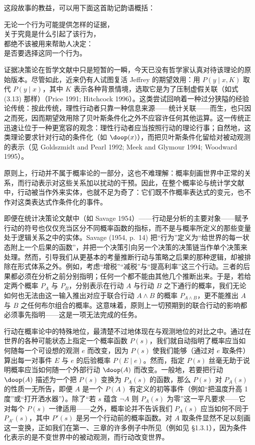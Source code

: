 这段故事的教益，可以用下面这首助记韵语概括：
\begin{center}
\kaishu
无论一个行为可能提供怎样的证据，\\[2pt]
关于究竟是什么引起了该行为，\\[2pt]
都绝不该被用来帮助人决定：\\[2pt]
是否要选择这同一个行为。
\end{center}

证据决策论在哲学文献中只是短暂的一瞬，今天已没有哲学家认真对待该理论的原始版本。尽管如此，近来仍有人试图复活 Jeffrey 的期望效用：用 $P(y\mid x,K)$ 取代 $P(y\mid x)$，其中 $K$ 表示各种背景情境，选取它是为了压制虚假关联（如式 \textup{(3.13)} 那样）（Price 1991; Hitchcock 1996）。这类尝试回响着一种过分狭隘的经验论传统：按此传统，理性行动者只靠一种信息来源——统计关联——而生，也只因之而死，因而期望效用除了贝叶斯条件化之外不应容许任何其他运算。这一传统正迅速让位于一种更宽容的观念：理性行动者应当按照行动的理论行事；自然地，这类理论要求针对行动的条件化（如 $\doop(x)$），而把贝叶斯条件化留给对被动观测的表示（见 Goldszmidt and Pearl 1992; Meek and Glymour 1994; Woodward 1995）。

原则上，行动并不属于概率论的一部分，这也不难理解：概率刻画世界中正常的关系，而行动表示对这些关系加以扰动的干预。因此，在整个概率论与统计学文献中，行动被当作外来实体，也就不足为奇了：它们既不作概率表达式的变元，也不作对这类表达式作条件化的事件。

即便在统计决策论文献中（如 Savage 1954）——行动是分析的主要对象——赋予行动的符号也仅仅充当区分不同概率函数的指标，而不是与概率所定义的那些变量处于逻辑关系之中的实体。Savage (1954, p.~14) 把“行为”定义为“给世界的每一状态附上一个后果的函数”，并把一个决策引向另一个决策的决策链当作单个决策来处理。然而，引导我们从更基本的考量推断行动与策略之后果的那种逻辑，却被排除在形式体系之外。例如，考虑“增税”“减税”与“提高利率”这三个行动。三者的后果都必须在分析之前分别指明；任何一个都不能由其他几个推断出来。于是，若给定两个概率 $P_A$ 与 $P_B$，分别表示在行动 $A$ 与行动 $B$ 之下通行的概率，我们无论如何也无法由这一输入推出对应于联合行动 $A\wedge B$ 的概率 $P_{A\wedge B}$，更不能推出 $A$ 与 $B$ 之任何布尔组合的概率。这意味着，原则上一切预期到的联合行动的影响都必须事先指明——这是一项无法完成的任务。

行动在概率论中的特殊地位，最清楚不过地体现在与观测地位的对比之中。通过在世界的各种可能状态上指定一个概率函数 $P(s)$，我们就自动指明了概率应当如何随每一个可设想的观测 $e$ 而改变，因为 $P(s)$ 使我们能够（通过对 $e$ 取条件）算出每一对事件 $E$ 与 $e$ 的后验概率 $P(E\mid e)$。然而，指定 $P(s)$ 丝毫无助于说明概率应当如何随一个外部行动 $\doop(A)$ 而改变。一般地，若要把行动 $\doop(A)$ 描述为一个把 $P(s)$ 变换为 $P_A(s)$ 的函数，那么 $P(s)$ 对 $P_A(s)$ 的性质一无所告，即便 $A$ 是一个 $P(A)$ 有定义的初等事件（例如“把温度升高 1 度”或“打开洒水器”）。除了“若 $s$ 蕴含 $\neg A$ 则 $P_A(s)$ 为零”这一平凡要求——它对每个 $P(s)$ 一律适用——之外，概率论并不告诉我们 $P_A(s)$ 应当如何不同于 $P_{A'}(s)$，其中 $P'(s)$ 是另一个行动前的概率函数。对 $A$ 取条件显然不足以刻画这一变换，正如我们在第一、三章的许多例子中所见（例如见 \S 1.3.1），因为条件化表示的是不变世界中的被动观测，而行动改变世界。


